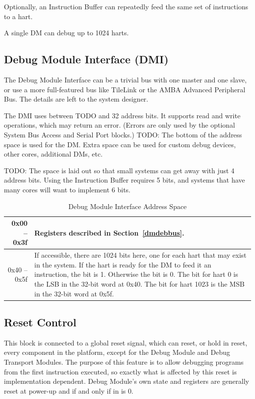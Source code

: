\documentclass{article}
\begin{document}
Optionally, an Instruction Buffer can repeatedly feed the same set of
instructions to a hart.

A single DM can debug up to 1024 harts.

\subsection{Debug Module Interface (DMI)}

The Debug Module Interface can be a trivial bus with one master and one slave,
or use a more full-featured bus like TileLink or the AMBA Advanced Peripheral
Bus. The details are left to the system designer.

The DMI uses between TODO and 32 address bits.  It supports read and write
operations, which may return an error. (Errors are only used by the optional
System Bus Access and Serial Port blocks.) TODO: The bottom of the address space is
used for the DM. Extra space can be used for custom debug devices, other cores,
additional DMs, etc.

TODO: The space is laid out so that small systems can get away with just 4
address bits. Using the Instruction Buffer requires 5 bits, and systems that
have many cores will want to implement 6 bits.

\begin{table}[htp]
    \centering
    \caption{Debug Module Interface Address Space}
    \label{tab:header}
    \begin{tabulary}{\textwidth}{|r|L|}
        \hline
        0x00 -- 0x3f & Registers described in Section~\ref{dmdebbus}. \\
        \hline
        0x40 -- 0x5f & If accessible, there are 1024 bits here, one for each
        hart that may exist in the system. If the hart is ready for the DM to
        feed it an instruction, the bit is 1. Otherwise the bit is 0. The bit
        for hart 0 is the LSB in the 32-bit word at 0x40. The bit for hart 1023
        is the MSB in the 32-bit word at 0x5f. \\
        \hline
    \end{tabulary}
\end{table}

\subsection{Reset Control} \label{reset}

This block is connected to a global reset signal, which can
reset, or hold in reset, every component in the platform,
except for the Debug Module and Debug
Transport Modules. The purpose of this feature is to allow debugging
programs from the first instruction executed, so exactly what is affected
by this reset is implementation dependent. Debug Module's own state and registers are
generally reset at power-up and if and only if
\Fdmactive in \Rdmcontrol is 0.
\end{document}
